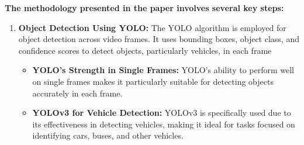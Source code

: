 {\begin{figure}[h!]
\end{figure}
%
%
\newpage
\noindent
\textbf{The methodology presented in the paper involves several key steps:}
\begin{enumerate}
  \item \textbf{Object Detection Using YOLO:} The YOLO algorithm is employed for object detection across video frames. It uses bounding boxes, object class, and confidence scores to detect
 objects, particularly vehicles, in each frame
  \begin{itemize}
    \item \textbf{YOLO's Strength in Single Frames:} YOLO's ability to perform well on single frames makes it particularly suitable for detecting objects accurately in each frame.
    \item \textbf{YOLOv3 for Vehicle Detection:} YOLOv3 is specifically used due to its effectiveness in detecting vehicles, making it ideal for tasks focused on identifying cars, buses, and other vehicles.
  \end{itemize}


\end{enumerate}}
